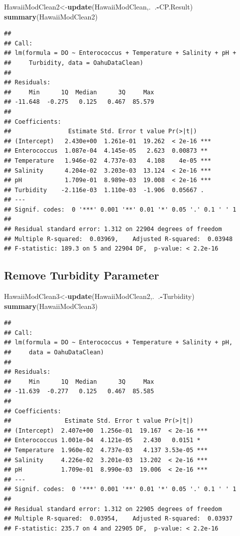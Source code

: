 \documentclass[12pt,]{article}
\newenvironment{Shaded}{\begin{snugshade}}{\end{snugshade}}
\newcommand{\KeywordTok}[1]{\textcolor[rgb]{0.13,0.29,0.53}{\textbf{#1}}}
\newcommand{\OperatorTok}[1]{\textcolor[rgb]{0.81,0.36,0.00}{\textbf{#1}}}
\newcommand{\NormalTok}[1]{#1}
\begin{document}
\begin{Shaded}
\begin{Highlighting}[]
\NormalTok{HawaiiModClean2<-}\KeywordTok{update}\NormalTok{(HawaiiModClean,.}\OperatorTok{~}\NormalTok{.}\OperatorTok{-}\NormalTok{CP.Result)}
\KeywordTok{summary}\NormalTok{(HawaiiModClean2)}
\end{Highlighting}
\end{Shaded}

\begin{verbatim}
## 
## Call:
## lm(formula = DO ~ Enterococcus + Temperature + Salinity + pH + 
##     Turbidity, data = OahuDataClean)
## 
## Residuals:
##     Min      1Q  Median      3Q     Max 
## -11.648  -0.275   0.125   0.467  85.579 
## 
## Coefficients:
##                Estimate Std. Error t value Pr(>|t|)    
## (Intercept)   2.430e+00  1.261e-01  19.262  < 2e-16 ***
## Enterococcus  1.087e-04  4.145e-05   2.623  0.00873 ** 
## Temperature   1.946e-02  4.737e-03   4.108    4e-05 ***
## Salinity      4.204e-02  3.203e-03  13.124  < 2e-16 ***
## pH            1.709e-01  8.989e-03  19.008  < 2e-16 ***
## Turbidity    -2.116e-03  1.110e-03  -1.906  0.05667 .  
## ---
## Signif. codes:  0 '***' 0.001 '**' 0.01 '*' 0.05 '.' 0.1 ' ' 1
## 
## Residual standard error: 1.312 on 22904 degrees of freedom
## Multiple R-squared:  0.03969,    Adjusted R-squared:  0.03948 
## F-statistic: 189.3 on 5 and 22904 DF,  p-value: < 2.2e-16
\end{verbatim}

\subsection{Remove Turbidity
Parameter}\label{remove-turbidity-parameter}

\begin{Shaded}
\begin{Highlighting}[]
\NormalTok{HawaiiModClean3<-}\KeywordTok{update}\NormalTok{(HawaiiModClean2,.}\OperatorTok{~}\NormalTok{.}\OperatorTok{-}\NormalTok{Turbidity)}
\KeywordTok{summary}\NormalTok{(HawaiiModClean3)}
\end{Highlighting}
\end{Shaded}

\begin{verbatim}
## 
## Call:
## lm(formula = DO ~ Enterococcus + Temperature + Salinity + pH, 
##     data = OahuDataClean)
## 
## Residuals:
##     Min      1Q  Median      3Q     Max 
## -11.639  -0.277   0.125   0.467  85.585 
## 
## Coefficients:
##               Estimate Std. Error t value Pr(>|t|)    
## (Intercept)  2.407e+00  1.256e-01  19.167  < 2e-16 ***
## Enterococcus 1.001e-04  4.121e-05   2.430   0.0151 *  
## Temperature  1.960e-02  4.737e-03   4.137 3.53e-05 ***
## Salinity     4.226e-02  3.201e-03  13.202  < 2e-16 ***
## pH           1.709e-01  8.990e-03  19.006  < 2e-16 ***
## ---
## Signif. codes:  0 '***' 0.001 '**' 0.01 '*' 0.05 '.' 0.1 ' ' 1
## 
## Residual standard error: 1.312 on 22905 degrees of freedom
## Multiple R-squared:  0.03954,    Adjusted R-squared:  0.03937 
## F-statistic: 235.7 on 4 and 22905 DF,  p-value: < 2.2e-16
\end{verbatim}
\end{document}
